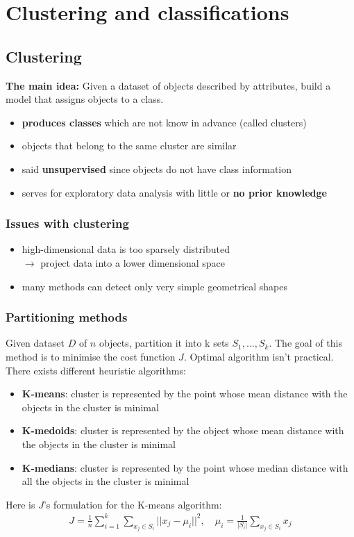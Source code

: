 \section{Clustering and classifications}

\subsection{Clustering}
\textbf{The main idea:} Given a dataset of objects described by attributes, build a model that assigns objects to a class. 

\begin{itemize}
	\item \textbf{produces classes} which are not know in advance (called clusters)
	\item objects that belong to the same cluster are similar
	\item said \textbf{unsupervised} since objects do not have class information 
	\item serves for exploratory data analysis with little or \textbf{no prior knowledge}
\end{itemize}

\subsubsection*{Issues with clustering}

\begin{itemize}
	\item high-dimensional data is too sparsely distributed 
	\\ $\rightarrow$ project data into a lower dimensional space
	\item many methods can detect only very simple geometrical shapes
\end{itemize}

\subsubsection*{Partitioning methods}
Given dataset $D$ of $n$ objects, partition it into k sets $S_1, ..., S_k$. The goal of this method is to minimise the cost function $J$. 
Optimal algorithm isn't practical. There exists different heuristic algorithms:

\begin{itemize}
	\item \textbf{K-means}: cluster is represented by the point whose mean distance with the objects in the cluster is minimal

	\item \textbf{K-medoids}: cluster is represented by the object whose mean distance with the objects in the cluster is minimal

	\item \textbf{K-medians}: cluster is represented by the point whose median distance with all the objects in the cluster is minimal
\end{itemize}
Here is $J$'s formulation for the K-means algorithm:
\begin{align*}
	J = \frac{1}{n} \sum_{i = 1}^{k} \sum_{x_j \in S_i} || x_j - \mu_i ||^2 , \quad \mu_i = \frac{1}{|S_i|} \sum_{x_j \in S_i} x_j
\end{align*}

